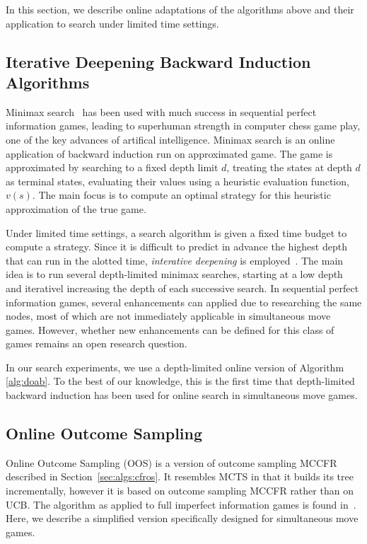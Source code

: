 
In this section, we describe online adaptations of the algorithms above and their application 
to search under limited time settings. 

\subsection{Iterative Deepening Backward Induction Algorithms} \label{sec:idbi}

Minimax search~\cite{AIbook} has been used with much success in sequential perfect information games, 
leading to superhuman strength in computer chess game play, one of the key advances of artifical 
intelligence. 
Minimax search is an online application of backward induction run on approximated game. 
The game is approximated by searching to a fixed depth limit $d$, treating the states at depth $d$
as terminal states, evaluating their values using a heuristic evaluation function, $v(s)$. 
The main focus is to compute an optimal strategy for this heuristic approximation of the true game. 

Under limited time settings, a search algorithm is given a fixed time budget to compute a strategy. 
Since it is difficult to predict in advance the highest depth that can run in the alotted time, 
{\it interative deepening} is employed~\cite{Marsland83}. The main idea is to run several depth-limited 
minimax searches, starting at a low depth and iterativel increasing the depth of each successive search. 
In sequential perfect information games, several enhancements can applied due to researching the same 
nodes, most of which are not immediately applicable in simultaneous move games. However, whether new 
enhancements can be defined for this class of games remains an open research question. 

In our search experiments, we use a depth-limited online version of Algorithm \ref{alg:doab}. To the 
best of our knowledge, this is the first time that depth-limited backward induction has been used for 
online search in simultaneous move games. 

\subsection{Online Outcome Sampling} \label{sec:oos}

Online Outcome Sampling (OOS) is a version of outcome sampling MCCFR described in 
Section~\ref{sec:algs:cfros}. It resembles MCTS in that it builds its tree incrementally, however it 
is based on outcome sampling MCCFR rather than on UCB. The algorithm as applied to full imperfect information
games is found in~\cite{Lanctot14OOS}. Here, we describe a simplified version specifically designed for 
simultaneous move games. 

